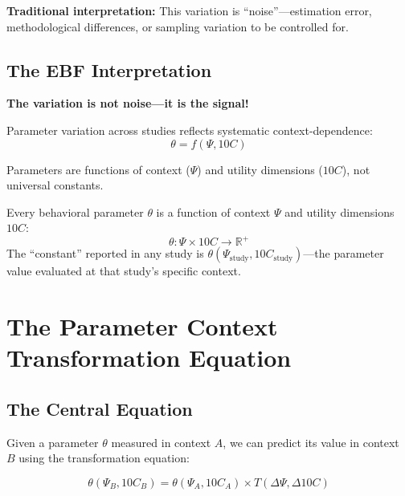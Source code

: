 \textbf{Traditional interpretation:} This variation is ``noise''---estimation error,
methodological differences, or sampling variation to be controlled for.

\subsection{The EBF Interpretation}

\begin{tcolorbox}[colback=green!5!white, colframe=green!75!black, title=Core Insight]
\textbf{The variation is not noise---it is the signal!}

Parameter variation across studies reflects systematic context-dependence:
\[
\theta = f(\Psi, 10C)
\]

Parameters are functions of context ($\Psi$) and utility dimensions ($10C$),
not universal constants.
\end{tcolorbox}

\begin{axiom}
\label{ax:pct-1}
Every behavioral parameter $\theta$ is a function of context $\Psi$ and
utility dimensions $10C$:
\[
\theta: \Psi \times 10C \to \mathbb{R}^+
\]
The ``constant'' reported in any study is $\theta(\Psi_{\text{study}}, 10C_{\text{study}})$---the
parameter value evaluated at that study's specific context.
\end{axiom}



\section{The Parameter Context Transformation Equation}
\label{sec:pct-equation}

\subsection{The Central Equation}

Given a parameter $\theta$ measured in context $A$, we can predict its value
in context $B$ using the transformation equation:

\begin{equation}
\boxed{
\theta(\Psi_B, 10C_B) = \theta(\Psi_A, 10C_A) \times T(\Delta\Psi, \Delta 10C)
}
\label{eq:pct-central}
\end{equation}

